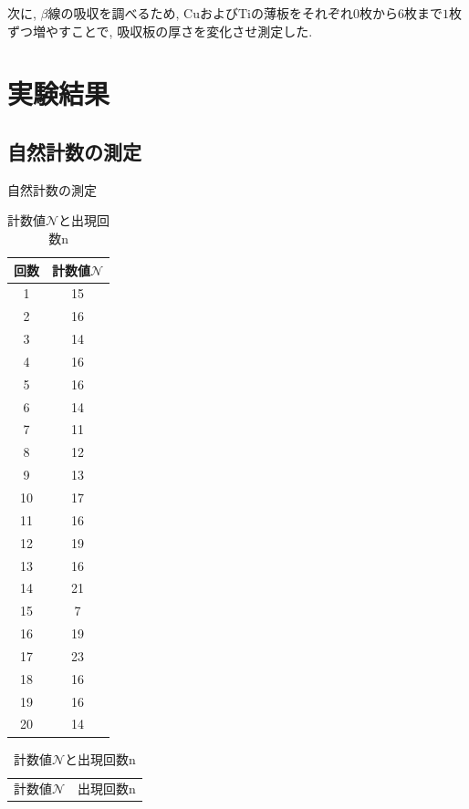 \documentclass{jarticle}
\begin{document}
次に, $\beta$線の吸収を調べるため, $\mathrm{Cu}$および$\mathrm{Ti}$の薄板をそれぞれ$0$枚から$6$枚まで$1$枚ずつ増やすことで, 吸収板の厚さを変化させ測定した.



\section{実験結果}


\subsection{自然計数の測定}

\begin{table}[H]
  \begin{minipage}[t]{0.45\textwidth}
    \centering
    \caption{自然計数の測定}
    \label{tb:natural-count}
    \begin{tabular}{cc}
      \hline
      回数 & 計数値$\mathcal{N}$ \\
      \hline
      1 & 15 \\
      2 & 16 \\
      3 & 14 \\
      4 & 16 \\
      5 & 16 \\
      6 & 14 \\
      7 & 11 \\
      8 & 12 \\
      9 & 13 \\
      10 & 17 \\
      11 & 16 \\
      12 & 19 \\
      13 & 16 \\
      14 & 21 \\
      15 & 7 \\
      16 & 19 \\
      17 & 23 \\
      18 & 16 \\
      19 & 16 \\
      20 & 14 \\
      \hline
    \end{tabular}
  \end{minipage}
  \begin{minipage}[t]{0.45\textwidth}
    \centering
    \caption{計数値$\mathcal{N}$と出現回数$\mathrm{n}$}
    \label{tb:count-distribution}
    \begin{tabular}{cc}
      \hline
      計数値$\mathcal{N}$ & 出現回数$\mathrm{n}$ \\

\end{tabular}
\end{minipage}
\end{table}
\end{document}

